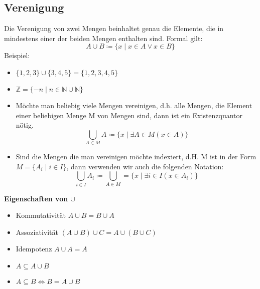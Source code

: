 \subsection{Verenigung}
Die Verenigung von zwei Mengen beinhaltet genau die Elemente, die in mindestens einer der beiden Mengen enthalten sind. Formal gilt:
\begin{equation}
A \cup B \coloneqq \{x \mid x \in A \vee x \in B\}
\end{equation}
Beispiel:
\begin{itemize}
    \item $\{1,2,3\} \cup \{3,4,5\} = \{1,2,3,4,5\}$
    \item $\mathbb{Z} = \{-n \mid n \in \mathbb{N} \cup \mathbb{N}\}$
\end{itemize}
\begin{itemize}
    \item Möchte man beliebig viele Mengen vereinigen, d.h. alle
    Mengen, die Element einer beliebigen Menge M von Mengen
    sind, dann ist ein Existenzquantor nötig.
    \begin{equation}
        \bigcup_{A \in M} A \coloneqq \{x \mid \exists{A} \in M(x \in A)\}
    \end{equation}
    \item Sind die Mengen die man vereinigen möchte indexiert, d.H. M ist in der Form $M = \{A_i \mid i \in I\}$,
    dann verwenden wir auch die folgenden Notation:
    \begin{equation}
        \bigcup_{i \in I} A_i \coloneqq \bigcup_{A \in M} = \{x \mid \exists{i} \in I(x \in A_i)\}
    \end{equation}
\end{itemize}

{\bf Eigenschaften von $\cup$}
\begin{itemize}
    \item Kommutativität $A \cup B = B \cup A$
    \item Assoziativität $(A \cup B) \cup C = A \cup (B \cup C)$
    \item Idempotenz $A \cup A = A$
    \item $A \subseteq A \cup B$
    \item $A \subseteq B \Leftrightarrow B = A \cup B$
\end{itemize}

